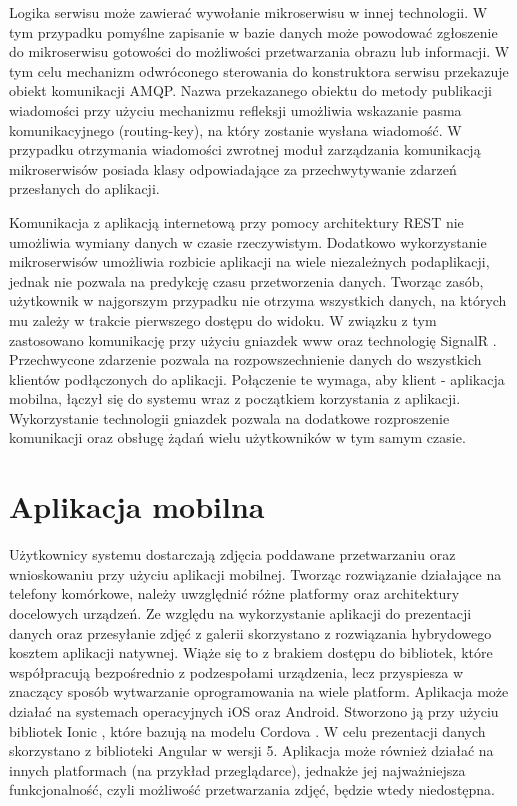 {Logika serwisu może zawierać wywołanie mikroserwisu w innej technologii. W tym przypadku pomyślne zapisanie w bazie danych może powodować zgłoszenie do mikroserwisu gotowości do możliwości przetwarzania obrazu lub informacji. W tym celu mechanizm odwróconego sterowania do konstruktora serwisu przekazuje obiekt komunikacji AMQP. Nazwa przekazanego obiektu do metody publikacji wiadomości przy użyciu mechanizmu refleksji umożliwia wskazanie pasma komunikacyjnego (routing-key), na który zostanie wysłana wiadomość. W przypadku otrzymania wiadomości zwrotnej moduł zarządzania komunikacją mikroserwisów posiada klasy odpowiadające za przechwytywanie zdarzeń przesłanych do aplikacji. 

Komunikacja z aplikacją internetową przy pomocy architektury REST nie umożliwia wymiany danych w czasie rzeczywistym. Dodatkowo wykorzystanie mikroserwisów umożliwia rozbicie aplikacji na wiele niezależnych podaplikacji, jednak nie pozwala na predykcję czasu przetworzenia danych. Tworząc zasób, użytkownik w najgorszym przypadku nie otrzyma wszystkich danych, na których mu zależy w trakcie pierwszego dostępu do widoku. W związku z tym zastosowano komunikację przy użyciu gniazdek www oraz technologię SignalR \cite{SignalR}. Przechwycone zdarzenie pozwala na rozpowszechnienie danych do wszystkich klientów podłączonych do aplikacji. Połączenie te wymaga, aby klient - aplikacja mobilna, łączył się do systemu wraz z początkiem korzystania z aplikacji. Wykorzystanie technologii gniazdek pozwala na dodatkowe rozproszenie komunikacji oraz obsługę żądań wielu użytkowników w tym samym czasie.

\section{Aplikacja mobilna}
{ Użytkownicy systemu dostarczają zdjęcia poddawane przetwarzaniu oraz wnioskowaniu przy użyciu aplikacji mobilnej. Tworząc rozwiązanie działające na telefony komórkowe, należy uwzględnić różne platformy oraz architektury docelowych urządzeń. Ze względu na wykorzystanie aplikacji do prezentacji danych oraz przesyłanie zdjęć z galerii skorzystano z rozwiązania hybrydowego kosztem aplikacji natywnej. Wiąże się to z brakiem dostępu do bibliotek, które współpracują bezpośrednio z podzespołami urządzenia, lecz przyspiesza w znaczący sposób wytwarzanie oprogramowania na wiele platform. Aplikacja może działać na systemach operacyjnych iOS oraz Android. Stworzono ją przy użyciu bibliotek Ionic \cite{Ionic}, które bazują na modelu Cordova \cite{Cordova}. W celu prezentacji danych skorzystano z biblioteki Angular\cite{Angular} w wersji 5. Aplikacja może również działać na innych platformach (na przykład przeglądarce), jednakże jej najważniejsza funkcjonalność, czyli możliwość przetwarzania zdjęć, będzie wtedy niedostępna.
	
}}
